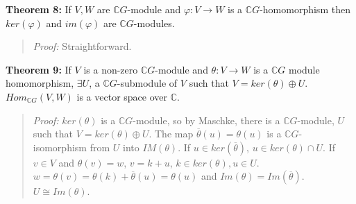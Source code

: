 {\bf Theorem 8:} If $V, W$ are ${\mathbb C}G$-module and
$\varphi: V \rightarrow W$ is a ${\mathbb C}G$-homomorphism
then $ker(\varphi)$ and $im(\varphi)$ are 
${\mathbb C}G$-modules. 
\begin{quote}
\emph{Proof:}  
Straightforward.
\end{quote}
{\bf Theorem 9:} If $V$ is a non-zero ${\mathbb C}G$-module 
and $\theta: V \rightarrow W$ is a ${\mathbb C}G$ module
homomorphism, $\exists U$, 
a ${\mathbb C}G$-submodule of $V$ such that $V= ker(\theta) \oplus U$.
$Hom_{{\mathbb C}G}(V,W)$ is a vector space over ${\mathbb C}$.  
\begin{quote}
\emph{Proof:}  
$ker(\theta)$ is a ${\mathbb C}G$-module, so by 
Maschke, there is a ${\mathbb C}G$-module, $U$ such that $V= ker(\theta) \oplus U$.
The map ${\overline  \theta}(u) = \theta(u)$ is a ${\mathbb C}G$-isomorphism from $U$ into $IM(\theta)$.
If $u \in ker({\overline \theta})$, $u \in ker(\theta) \cap U$.  If $v \in V$ and $\theta(v)= w$, $v = k + u$,
$k \in ker(\theta), u \in U$.  $w= \theta(v)= \theta(k) + {\overline \theta}(u) = \theta(u)$ and $Im(\theta)= Im({\overline \theta})$.
$U \cong Im(\theta)$.
\end{quote}
